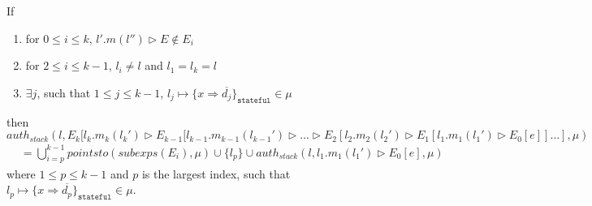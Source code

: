 \documentclass{llncs}
\newcommand{\keywadj}[1]{\mathtt{#1}}
\begin{document}
\begin{mdframed}
\begin{lemma}
\label{l:five}
If
\begin{enumerate}
\item for $0 \leq i \leq k$, $l'.m(l'') \rhd E \not\in E_i$
\item for $2 \leq i \leq k - 1$, $l_i \neq l$ and $l_1 = l_k = l$
\item $\exists j$, such that $1 \leq j \leq k - 1$, $l_j \mapsto \{ x \Rightarrow \overline{d_j} \}_{\keywadj{stateful}} \in \mu$
\end{enumerate}
then
\noindent$auth_{stack}(l, E_k[l_k.m_k(l_k') \rhd E_{k-1}[l_{k-1}.m_{k-1}(l_{k-1}') \rhd \dots \rhd E_2[l_2.m_2(l_2') \rhd E_1[l_1.m_1(l_1') \rhd E_0[e]] \dots ], \mu)$
\vspace{-7pt}
\begin{align*}
&=  \bigcup^{k-1}_{i = p} pointsto(subexps(E_i), \mu) \cup \{ l_p \} \cup auth_{stack}(l, l_1.m_1(l_1') \rhd E_0[e], \mu)
\end{align*}
where $1 \leq p \leq k - 1$ and $p$ is the largest index, such that $l_p \mapsto \{ x \Rightarrow \overline{d_p} \}_{\keywadj{stateful}} \in \mu$.
\end{lemma}
\end{mdframed}
\end{document}
